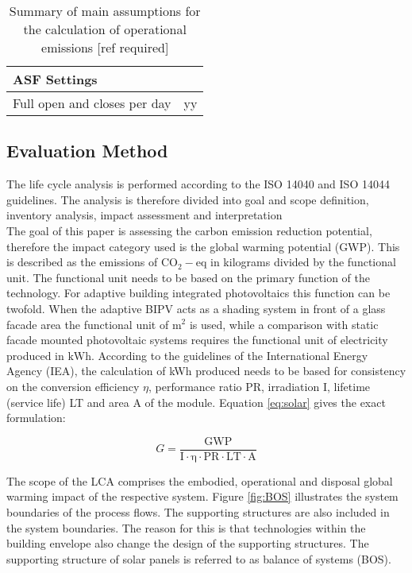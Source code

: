 \begin{table}[H]
\begin{tabular}{ll}
\textbf{ASF Settings}         &                                                \\
\hline
Full open and closes per day  &   yy                                           \\
\hline
\end{tabular}
\caption{Summary of main assumptions for the calculation of operational emissions [ref required]}
\label{tab:AssumptionsOpp}
\end{table}



\subsection{Evaluation Method}
The life cycle analysis is performed according to the ISO 14040 and ISO 14044 guidelines. The analysis is therefore divided into goal and scope definition, inventory analysis, impact assessment and interpretation\\ %

The goal of this paper is assessing the carbon emission reduction potential, therefore the impact category used is the global warming potential (GWP). This is described as the emissions of ${\mathrm{CO_2-eq}}$ in kilograms divided by the functional unit. The functional unit needs to be based on the primary function of the technology. For adaptive building integrated photovoltaics this function can be twofold. When the adaptive BIPV acts as a shading system in front of a glass facade area the functional unit of ${\mathrm{m^2}}$ is used, while a comparison with static facade mounted photovoltaic systems requires the functional unit of electricity produced in ${\mathrm{kWh}}$. According to the guidelines of the International Energy Agency (IEA), the calculation of kWh produced needs to be based for consistency on the conversion efficiency ${\eta}$, performance ratio PR, irradiation I, lifetime (service life) LT and area A of the module. Equation \ref{eq:solar} gives the exact formulation:
	
\begin{equation}
G=\frac{{\mathrm{GWP}}}{{\mathrm{I \cdot \eta  \cdot PR \cdot LT \cdot A}}}
\label{eq:solar}
\end{equation}

The scope of the LCA comprises the embodied, operational and disposal global warming impact of the respective system. Figure \ref{fig:BOS} illustrates the system boundaries of the process flows. The supporting structures are also included in the system boundaries. The reason for this is that technologies within the building envelope also change the design of the supporting structures. The supporting structure of solar panels is referred to as balance of systems (BOS).

